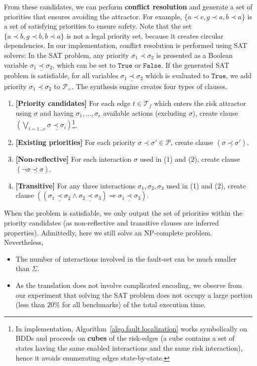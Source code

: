 \documentclass[10pt, a4paper, onecolumn, conference, compsocconf]{IEEEtran}
\newcommand{\true}{\texttt{True}}
\newcommand{\false}{\texttt{False}}
\begin{document}
From these candidates, we can perform \textbf{conflict resolution} and
generate a set of priorities that ensures avoiding the attractor.  For
example, $\{a\prec c, g \prec a, b \prec a\}$ is a set of satisfying
priorities to ensure safety. Note that the set $\{a\prec b, g \prec b,
b \prec a\}$ is not a legal priority set, because it creates circular
dependencies. In our implementation, conflict resolution is performed
using SAT solvers: In the SAT problem, any priority $\sigma_1 \prec
\sigma_2$ is presented as a Boolean variable $\underline{\sigma_1
  \prec \sigma_2}$, which can be set to $\true$ or $\false$.  If the
generated SAT problem is satisfiable, for all variables
$\underline{\sigma_1 \prec \sigma_2}$ which is evaluated to $\true$,
we add priority $\sigma_1 \prec \sigma_2$ to $\mathcal{P}_{+}$. The
synthesis engine creates four types of clauses. \begin{enumerate}
    \item \textbf{[Priority candidates]} For each edge $t \in \mathcal{T}_{f}$ which enters the risk attractor using $\sigma$ and having $ \sigma_1, \ldots, \sigma_e$ available actions (excluding $\sigma$), create clause $(\bigvee_{i=1 \ldots e} \underline{\sigma \prec \sigma_{i}})$\footnote{In implementation, Algorithm~\ref{algo.fault.localization} works symbolically on BDDs and proceeds on \textbf{cubes} of the risk-edges (a cube contains a set of states having the same enabled interactions and the same risk interaction), hence it avoids enumerating edges state-by-state.}.
    \item \textbf{[Existing priorities]} For each priority $\sigma \prec \sigma' \in \mathcal{P}$, create
        clause $(\underline{\sigma \prec \sigma'})$.
    \item \textbf{[Non-reflective]} For each interaction $\sigma$ used in (1) and (2), create clause
            $(\neg \underline{\sigma \prec \sigma})$.
    \item \textbf{[Transitive]} For any three interactions $\sigma_1, \sigma_2, \sigma_3$  used in (1) and (2), create clause
            $((\underline{\sigma_1 \prec \sigma_2} \wedge \underline{\sigma_2 \prec \sigma_3})\Rightarrow \underline{\sigma_1 \prec \sigma_3})$.
\end{enumerate}
\noindent When the problem is satisfiable, we only output the set of priorities within the priority candidates (as non-reflective and transitive clauses are inferred properties). Admittedly, here we still solve an NP-complete problem. Nevertheless,
\begin{itemize}
    \item The number of interactions involved in the fault-set can be much smaller than $\Sigma$.
    \item As the translation does not involve complicated encoding, we observe from our experiment that solving the SAT problem does not occupy a large portion (less than $20\%$ for all benchmarks) of the total execution time.
\end{itemize}
\end{document}
